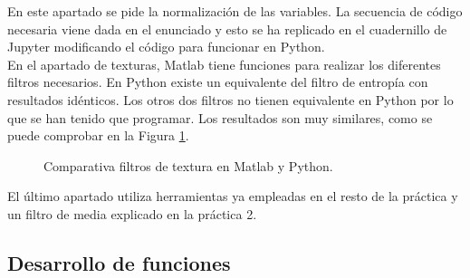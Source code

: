 \documentclass[a4paper,12pt]{report}
\begin{document}
En este apartado se pide la normalización de las variables. La secuencia de código necesaria viene dada en el enunciado y esto se ha replicado en el cuadernillo de Jupyter modificando el código para funcionar en Python.\\

En el apartado de texturas, Matlab tiene funciones para realizar los diferentes filtros necesarios. En Python existe un equivalente del filtro de entropía con resultados idénticos. Los otros dos filtros no tienen equivalente en Python por lo que se han tenido que programar. Los resultados son muy similares, como se puede comprobar en la Figura \ref{texturas}.\\


\begin{figure}[!tbp]
  \centering
  \hfill
  \caption{Comparativa filtros de textura en Matlab y Python.}
  \label{texturas}
\end{figure}

El último apartado utiliza herramientas ya empleadas en el resto de la práctica y un filtro de media explicado en la práctica 2.\\

\subsection{Desarrollo de funciones}
\end{document}
